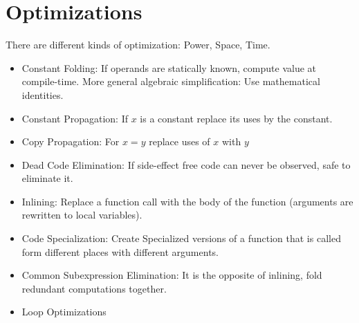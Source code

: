 \section*{Optimizations}
There are different kinds of optimization: Power, Space, Time.

\begin{itemize}
	\item Constant Folding: If operands are statically known, compute value at compile-time. More general algebraic simplification: Use mathematical identities.
	
	\item Constant Propagation: If $x$ is a constant replace its uses by the constant.
	
	\item Copy Propagation: For $x = y$ replace uses of $x$ with $y$
	
	\item Dead Code Elimination: If side-effect free code can never be observed, safe to eliminate it.
	
	\item Inlining: Replace a function call with the body of the function (arguments are rewritten to local variables).
	
	\item Code Specialization: Create Specialized versions of a function that is called form different places with different arguments.
	
	\item Common Subexpression Elimination: It is the opposite of inlining, fold redundant computations together.
	
	\item Loop Optimizations
\end{itemize}


